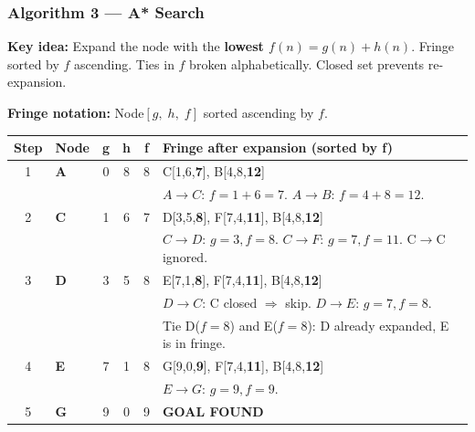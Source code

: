 \documentclass[12pt, a4paper]{article}
\newcommand{\goal}{\textcolor{green!55!black}{\textbf{GOAL FOUND}}}
\begin{document}
\vspace{1em}

\subsubsection*{Algorithm 3 — A* Search}

\textbf{Key idea:} Expand the node with the \textbf{lowest $f(n) = g(n) + h(n)$}. Fringe sorted by $f$ ascending.
Ties in $f$ broken alphabetically. Closed set prevents re-expansion.

\textbf{Fringe notation:} Node$[g,\; h,\; f]$ sorted ascending by $f$.

\vspace{0.4em}
\begin{center}
\renewcommand{\arraystretch}{1.35}
\scriptsize
\begin{tabular}{c|l|c|c|c|p{7.5cm}}
\toprule
\textbf{Step} & \textbf{Node} & \textbf{g} & \textbf{h} & \textbf{f} &
\textbf{Fringe after expansion (sorted by f)} \\
\midrule
1 & \textbf{A} & 0 & 8 & 8
  & C[1,6,\textbf{7}],\; B[4,8,\textbf{12}] \\
  & & & & & \footnotesize $A{\to}C$: $f{=}1{+}6{=}7$. $A{\to}B$: $f{=}4{+}8{=}12$. \\
\midrule
2 & \textbf{C} & 1 & 6 & 7
  & D[3,5,\textbf{8}],\; F[7,4,\textbf{11}],\; B[4,8,\textbf{12}] \\
  & & & & & \footnotesize $C{\to}D$: $g{=}3,f{=}8$. $C{\to}F$: $g{=}7,f{=}11$. C$\to$C ignored. \\
\midrule
3 & \textbf{D} & 3 & 5 & 8
  & E[7,1,\textbf{8}],\; F[7,4,\textbf{11}],\; B[4,8,\textbf{12}] \\
  & & & & & \footnotesize $D{\to}C$: C closed $\Rightarrow$ skip. $D{\to}E$: $g{=}7,f{=}8$. \\
  & & & & & \footnotesize Tie D($f{=}8$) and E($f{=}8$): D already expanded, E is in fringe. \\
\midrule
4 & \textbf{E} & 7 & 1 & 8
  & G[9,0,\textbf{9}],\; F[7,4,\textbf{11}],\; B[4,8,\textbf{12}] \\
  & & & & & \footnotesize $E{\to}G$: $g{=}9,f{=}9$. \\
\midrule
5 & \textbf{G} & 9 & 0 & 9
  & \goal \\
\bottomrule
\end{tabular}
\end{center}
\end{document}
